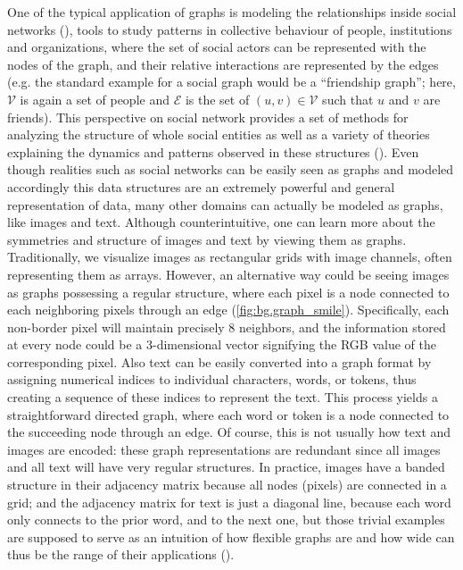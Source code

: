 \documentclass[binding=0.6cm]{sapthesis}
\newcommand{\mycite}[1]{(\cite{#1})}
\begin{document}
One of the typical application of graphs is modeling the relationships inside social networks \mycite{Wu_Lian_Xu_Wu_Chen_2020}, tools to study patterns in collective behaviour of people, institutions and organizations, where the set of social actors can be represented with the nodes of the graph, and their relative interactions are represented by the edges (e.g. the standard example for a social graph would be a “friendship graph”; here, $\mathcal{V}$ is again a set of people and $\mathcal{E}$ is the set of $(u, v) \in \mathcal{V}$ such that $u$ and $v$ are friends). This perspective on social network provides a set of methods for analyzing the structure of whole social entities as well as a variety of theories explaining the dynamics and patterns observed in these structures \mycite{wasserman_faust_1994}. Even though realities such as social networks can be easily seen as graphs and modeled accordingly this data structures are an extremely powerful and general representation of data, many other domains can actually be modeled as graphs, like images and text. Although counterintuitive, one can learn more about the symmetries and structure of images and text by viewing them as graphs. 
Traditionally, we visualize images as rectangular grids with image channels, often representing them as arrays. However, an alternative way could be seeing images as graphs possessing a regular structure, where each pixel is a node connected to each neighboring pixels through an edge (\cref{fig:bg.graph_smile}). Specifically, each non-border pixel will maintain precisely 8 neighbors, and the information stored at every node could be a 3-dimensional vector signifying the RGB value of the corresponding pixel. Also text can be easily converted into a graph format by assigning numerical indices to individual characters, words, or tokens, thus creating a sequence of these indices to represent the text. This process yields a straightforward directed graph, where each word or token is a node connected to the succeeding node through an edge. Of course, this is not usually how text and images are encoded: these graph representations are redundant since all images and all text will have very regular structures. In practice, images have a banded structure in their adjacency matrix because all nodes (pixels) are connected in a grid; and the adjacency matrix for text is just a diagonal line, because each word only connects to the prior word, and to the next one, but those trivial examples are supposed to serve as an intuition of how flexible graphs are and how wide can thus be the range of their applications \mycite{distilPub-sanchez-lengeling2021a}.
\end{document}
